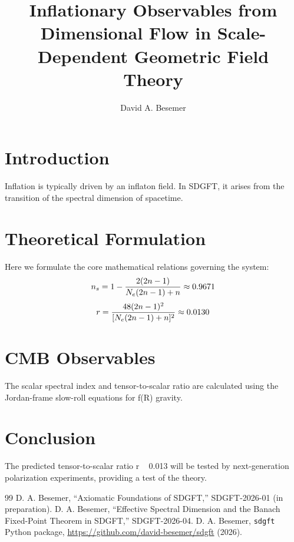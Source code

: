 \documentclass[a4paper,11pt]{article}
\begin{document}
\title{Inflationary Observables from Dimensional Flow in Scale-Dependent Geometric Field Theory}

\author{David A. Besemer}



\maketitle

\section{Introduction}
Inflation is typically driven by an inflaton field. In SDGFT, it arises from the transition of the spectral dimension of spacetime.

\section{Theoretical Formulation}
Here we formulate the core mathematical relations governing the system:
\begin{equation}
  n_s = 1 - \frac{2(2n-1)}{N_e(2n-1) + n} \approx 0.9671
\end{equation}
\begin{equation}
  r = \frac{48(2n-1)^2}{[N_e(2n-1) + n]^2} \approx 0.0130
\end{equation}
\section{CMB Observables}
The scalar spectral index and tensor-to-scalar ratio are calculated using the Jordan-frame slow-roll equations for f(R) gravity.

\section{Conclusion}
The predicted tensor-to-scalar ratio r ~ 0.013 will be tested by next-generation polarization experiments, providing a test of the theory.



\begin{thebibliography}{99}
 D. A. Besemer, ``Axiomatic Foundations of SDGFT,'' SDGFT-2026-01 (in preparation).
 D. A. Besemer, ``Effective Spectral Dimension and the Banach Fixed-Point Theorem in SDGFT,'' SDGFT-2026-04.
 D. A. Besemer, \texttt{sdgft} Python package, \url{https://github.com/david-besemer/sdgft} (2026).
\end{thebibliography}
\end{document}
